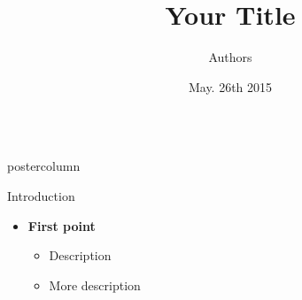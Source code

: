 \documentclass[final]{beamer}
\title{\huge Your Title }
\author{Authors }
\institute[Univerist\'e de Bourgogne]{Institute and Universities }
\date[May. 26th 2015]{May. 26th 2015}
\newlength{\columnheight}
\begin{document}
\begin{frame}
  \begin{columns}
    
    \begin{column}{.49\textwidth}
      \begin{beamercolorbox}[center,wd=\textwidth]{postercolumn}
        \begin{minipage}[T]{.95\textwidth}  %
          \parbox[t][\columnheight]{\textwidth}{ %

            \begin{block}{Introduction}
              \begin{itemize}
               \item \textbf{\color{orounam}First point }
               \begin{itemize}
               		\item Description 
               		\item More description
               \end{itemize}  
              \end{itemize}                 
            \end{block}
            \vfill
  
}
\end{minipage}
\end{beamercolorbox}
\end{column}
\end{columns}
\end{frame}
\end{document}
